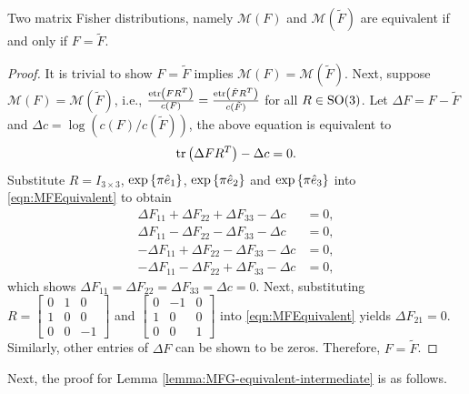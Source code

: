 \begin{lemma} \label{lemma:MF-equivalent}
	Two matrix Fisher distributions, namely  $\mathcal{M}(F)$ and $\mathcal{M}(\tilde F)$ are equivalent if and only if $F=\tilde{F}$.
\end{lemma}
\begin{proof}
	It is trivial to show $F = \tilde F$ implies $\mathcal{M}(F)=\mathcal{M}(\tilde F)$.
	Next, suppose $\mathcal{M}(F)=\mathcal{M}(\tilde F)$, i.e.,  $\frac{\mathrm{etr}\left( FR^T \right)}{c(F)} = \frac{\mathrm{etr}\left( \tilde{F}R^T \right)}{c(\tilde{F})}$ for all $R\in\mathrm{SO}(3)$.
	Let $\Delta F = F-\tilde{F}$ and $\Delta c = \log(c(F)/c(\tilde{F}))$, the above equation is equivalent to
	\begin{equation} \label{eqn:MFEquivalent}
		\mathrm{tr}\left( \Delta FR^T \right) - \Delta c = 0.  
	\end{equation}
	Substitute $R = I_{3\times3}$, $\exp\left\{ \pi\hat{e}_1 \right\}$, $\exp\left\{ \pi\hat{e}_2 \right\}$ and $\exp\left\{ \pi\hat{e}_3 \right\}$ into \eqref{eqn:MFEquivalent} to obtain
	\begin{align*}
		\Delta F_{11} + \Delta F_{22} + \Delta F_{33} - \Delta c &= 0, \\
		\Delta F_{11} - \Delta F_{22} - \Delta F_{33} - \Delta c &= 0, \\
		-\Delta F_{11} + \Delta F_{22} - \Delta F_{33} - \Delta c &= 0, \\
		-\Delta F_{11} - \Delta F_{22} + \Delta F_{33} - \Delta c &= 0,
	\end{align*}
	which shows $\Delta F_{11} = \Delta F_{22} = \Delta F_{33} = \Delta c = 0$.
	Next, substituting $R = \begin{bmatrix} 0 & 1 & 0 \\ 1 & 0 & 0 \\ 0 & 0 & -1 \end{bmatrix}$ and $\begin{bmatrix} 0 & -1 & 0 \\ 1 & 0 & 0 \\ 0 & 0 & 1 \end{bmatrix}$ into \eqref{eqn:MFEquivalent} yields $\Delta F_{21} = 0$.
	Similarly, other entries of $\Delta F$ can be shown to be zeros. 
	Therefore, $F=\tilde{F}$.
\end{proof}

Next, the proof for Lemma \ref{lemma:MFG-equivalent-intermediate} is as follows.

